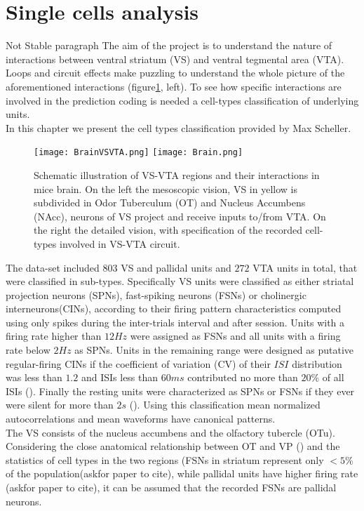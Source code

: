 
\section{Single cells analysis}
\label{chap:UnitsAnalysis}
{\color{red} Not Stable paragraph}
The aim of the project is to understand the nature of interactions between ventral striatum (VS) and ventral tegmental area (VTA). Loops and circuit effects make puzzling to understand the whole picture of the aforementioned interactions (figure\ref{fig:Brain}, left). To see how specific interactions are involved in the prediction coding is needed a cell-types classification of underlying units.\\
In this chapter we present the cell types classification provided by Max Scheller.
\begin{figure}
    \centering
    \texttt{[image: BrainVSVTA.png]}
    \texttt{[image: Brain.png]}
    \caption{Schematic illustration of VS-VTA regions and their interactions in mice brain. On the left the mesoscopic vision, VS in yellow is subdivided in Odor Tuberculum (OT) and Nucleus Accumbens (NAcc), neurons of VS project and receive inputs to/from VTA. On the right the detailed vision, with specification of the recorded cell-types involved in VS-VTA circuit.}
    \label{fig:Brain}
\end{figure}
The data-set included $803$ VS and pallidal units and $272$ VTA units in total, that were classified in sub-types. Specifically VS units were classified as either striatal projection neurons (SPNs), fast-spiking neurons (FSNs) or cholinergic interneurons(CINs), according to their firing pattern characteristics computed using only spikes during the inter-trials interval and after session. Units with a firing rate higher than $12 Hz$ were assigned as FSNs and all units with a firing rate below $2 Hz$ as SPNs. Units in the remaining range were designed as putative regular-firing CINs if the coefficient of variation (CV) of their $ISI$ distribution was less than $1.2$ and ISIs less than $60 ms$ contributed no more than $20\%$ of all ISIs (\cite{Inokawa}). Finally the resting units were characterized as SPNs or FSNs if they ever were silent for more than $2s$ (\cite{Graybiel}). Using this classification mean normalized autocorrelations and mean waveforms have canonical patterns.\\ The VS consists of the nucleus accumbens and the olfactory tubercle (OTu).
Considering the close anatomical relationship between OT and VP (\cite{Heimer1982}) and the statistics of cell types in the two regions (FSNs in striatum represent only $<5\%$ of the population({\color{red}askfor paper to cite}), while pallidal units have higher firing rate ({\color{red}askfor paper to cite}), it can be assumed that the recorded FSNs are pallidal neurons.\\
